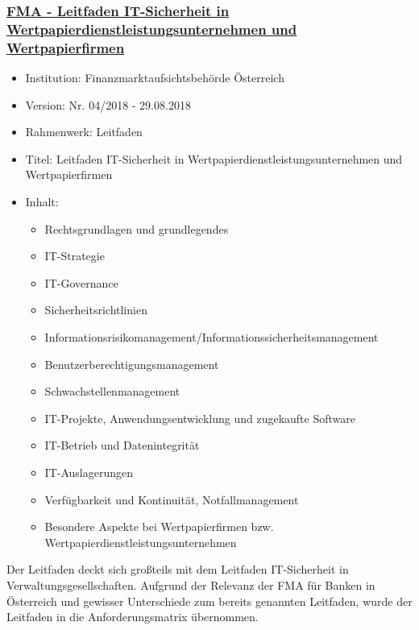 
\subsubsection{\underline{FMA - Leitfaden IT-Sicherheit in Wertpapierdienstleistungsunternehmen und Wertpapierfirmen}}
\begin{itemize}
    \item Institution: Finanzmarktaufsichtsbehörde Österreich
    \item Version: Nr. 04/2018 - 29.08.2018
    \item Rahmenwerk: Leitfaden
    \item Titel: Leitfaden IT-Sicherheit in Wertpapierdienstleistungsunternehmen und Wertpapierfirmen \autocite{FMA_Leitfaden_IT_Sicherheit_Wertpapier}
    \item Inhalt: 
    \begin{itemize}
        \item Rechtsgrundlagen und grundlegendes 
        \item IT-Strategie 
        \item IT-Governance 
        \item Sicherheitsrichtlinien 
        \item Informationsrisikomanagement/Informationssicherheitsmanagement 
        \item Benutzerberechtigungsmanagement 
        \item Schwachstellenmanagement 
        \item IT-Projekte, Anwendungsentwicklung und zugekaufte Software 
        \item IT-Betrieb und Datenintegrität 
        \item IT-Auslagerungen 
        \item Verfügbarkeit und Kontinuität, Notfallmanagement 
        \item Besondere Aspekte bei Wertpapierfirmen bzw. Wertpapierdienstleistungsunternehmen
    \end{itemize}
\end{itemize}
\bigbreak
Der Leitfaden deckt sich großteils mit dem \glqq{}Leitfaden IT-Sicherheit in Verwaltungsgesellschaften\grqq{}. Aufgrund der Relevanz der FMA für Banken in Österreich und gewisser Unterschiede zum bereits genannten Leitfaden, wurde der Leitfaden in die Anforderungsmatrix übernommen.


